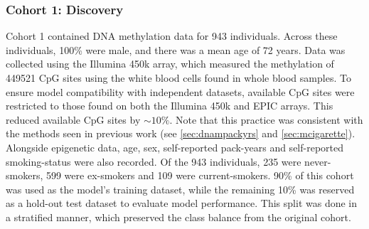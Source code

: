 \documentclass[draft]{article}
\begin{document}
\subsubsection{Cohort 1: Discovery}
Cohort 1 contained DNA methylation data for 943 individuals. Across these individuals, 100\% were male, and there was a mean age of 72 years. Data was collected using the Illumina 450k array, which measured the methylation of \num{449521} CpG sites using the white blood cells found in whole blood samples. To ensure model compatibility with independent datasets, available CpG sites were restricted to those found on both the Illumina 450k and EPIC arrays. This reduced available CpG sites by \(\sim\!10\%\). Note that this practice was consistent with the methods seen in previous work (see \ref{sec:dnampackyrs} and \ref{sec:mcigarette}). Alongside epigenetic data, age, sex, self-reported pack-years and self-reported smoking-status were also recorded. Of the 943 individuals, 235 were never-smokers, 599 were ex-smokers and 109 were current-smokers. 90\% of this cohort was used as the model's training dataset, while the remaining 10\% was reserved as a hold-out test dataset to evaluate model performance. This split was done in a stratified manner, which preserved the class balance from the original cohort.

\end{document}
